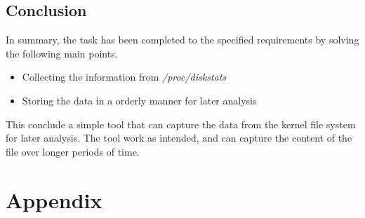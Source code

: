 \subsection{Conclusion}
In summary, the task has been completed to the specified requirements by
solving the following main points.
\begin{itemize}
    \item Collecting the information from \textit{/proc/diskstats}
    \item Storing the data in a orderly manner for later analysis
\end{itemize}

This conclude a simple tool that can capture the data from the kernel
file system for later analysis. The tool work as intended, and can capture the
content of the file over longer periods of time.

\section{Appendix}
\thispagestyle{empty}
\begin{center}

\end{center}
